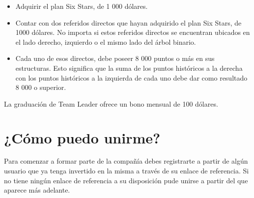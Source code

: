 \documentclass[12pt,letterpaper]{article}
\begin{document}
   \begin{itemize}
   	\item Adquirir el plan Six Stars, de 1 000 dólares.
   	\item Contar con dos referidos directos que hayan adquirido el plan Six Stars, de 1000 dólares. No importa si estos referidos directos se encuentran ubicados en el lado derecho, izquierdo o el mismo lado del árbol binario.
   	\item Cada uno de esos directos, debe poseer 8 000 puntos o más en sus estructuras. Esto significa que la suma de los puntos históricos a la derecha con los puntos históricos a la izquierda de cada uno debe dar como resultado 8 000 o superior.
   \end{itemize}
        
   La graduación de Team Leader ofrece un bono mensual de 100 dólares.
   
   \section{¿Cómo puedo unirme?}
   Para comenzar a formar parte de la compañía debes registrarte a partir de algún usuario que ya tenga invertido en la misma a través de su enlace de referencia. Si no tiene ningún enlace de referencia a su disposición pude unirse a partir del que aparece más adelante.
   
   
\end{document}
